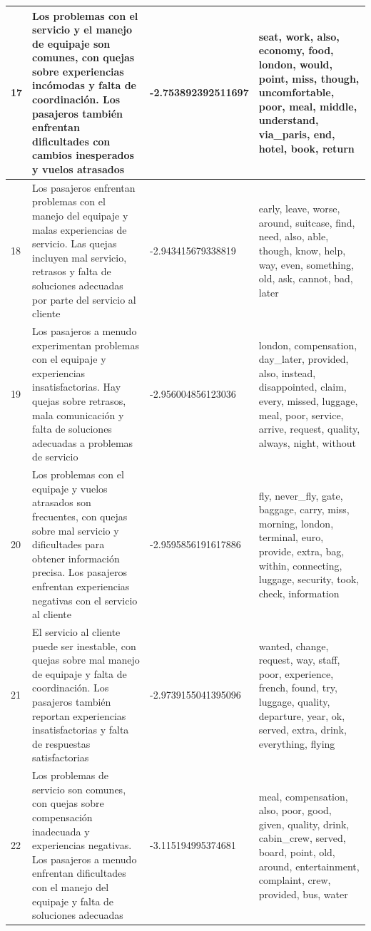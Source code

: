 \documentclass{report}
\begin{document}
{{\begin{longtable}{|p{1cm}|p{4cm}|p{4cm}|p{6cm}|}
                    \hline
                    17 & Los problemas con el servicio y el manejo de equipaje son comunes, con quejas sobre experiencias incómodas y falta de coordinación. Los pasajeros también enfrentan dificultades con cambios inesperados y vuelos atrasados & -2.753892392511697 & seat, work, also, economy, food, london, would, point, miss, though, uncomfortable, poor, meal, middle, understand, via\_paris, end, hotel, book, return \\
                    \hline
                    18 & Los pasajeros enfrentan problemas con el manejo del equipaje y malas experiencias de servicio. Las quejas incluyen mal servicio, retrasos y falta de soluciones adecuadas por parte del servicio al cliente & -2.943415679338819 & early, leave, worse, around, suitcase, find, need, also, able, though, know, help, way, even, something, old, ask, cannot, bad, later \\
                    \hline
                    19 & Los pasajeros a menudo experimentan problemas con el equipaje y experiencias insatisfactorias. Hay quejas sobre retrasos, mala comunicación y falta de soluciones adecuadas a problemas de servicio & -2.956004856123036 & london, compensation, day\_later, provided, also, instead, disappointed, claim, every, missed, luggage, meal, poor, service, arrive, request, quality, always, night, without \\
                    \hline
                    20 & Los problemas con el equipaje y vuelos atrasados son frecuentes, con quejas sobre mal servicio y dificultades para obtener información precisa. Los pasajeros enfrentan experiencias negativas con el servicio al cliente & -2.9595856191617886 & fly, never\_fly, gate, baggage, carry, miss, morning, london, terminal, euro, provide, extra, bag, within, connecting, luggage, security, took, check, information \\
                    \hline
                    21 & El servicio al cliente puede ser inestable, con quejas sobre mal manejo de equipaje y falta de coordinación. Los pasajeros también reportan experiencias insatisfactorias y falta de respuestas satisfactorias & -2.9739155041395096 & wanted, change, request, way, staff, poor, experience, french, found, try, luggage, quality, departure, year, ok, served, extra, drink, everything, flying \\
                    \hline
                    22 & Los problemas de servicio son comunes, con quejas sobre compensación inadecuada y experiencias negativas. Los pasajeros a menudo enfrentan dificultades con el manejo del equipaje y falta de soluciones adecuadas & -3.115194995374681 & meal, compensation, also, poor, good, given, quality, drink, cabin\_crew, served, board, point, old, around, entertainment, complaint, crew, provided, bus, water \\

\end{longtable}}}
\end{document}
